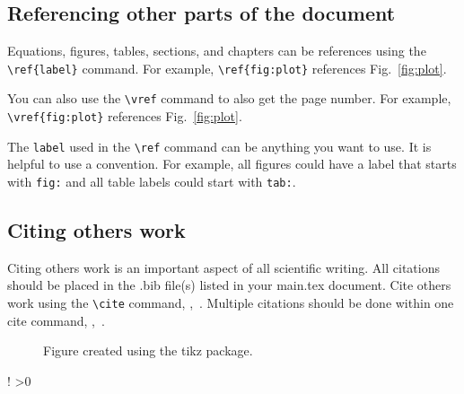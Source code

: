\subsection{Referencing other parts of the document}\label{Sect:ref}
Equations, figures, tables, sections, and chapters can be references using the \verb|\ref{label}| command.  For example, \verb|\ref{fig:plot}| references Fig.~\ref{fig:plot}.  

You can also use the \verb|\vref| command to also get the page number.  For example, \verb|\vref{fig:plot}| references Fig.~\vref{fig:plot}.

The \verb|label| used in the \verb|\ref| command can be anything you want to use. It is helpful to use a convention.  For example, all figures could have a label that starts with \verb|fig:| and all table labels could start with \verb|tab:|.

\subsection{Citing others work}\label{Sect:cite}
Citing others work is an important aspect of all scientific writing.  All citations should be placed in the .bib file(s) listed in your main.tex document.  Cite others work using the \verb|\cite| command, \eg,~\cite{owkes_mesh-decoupled_2015}.  Multiple citations should be done within one cite command, \eg,~\cite{desjardins_direct_2013,owkes_discontinuous_2013,owkes_computational_2014}.  




\newcount\loopcount
{}

\loop 
  \begin{figure}[htbp]
    \centering
    \caption{Figure created using the tikz package.}
  \end{figure}
  \clearpage
  !
\advance{}
\ifnum\loopcount>0
\repeat 

